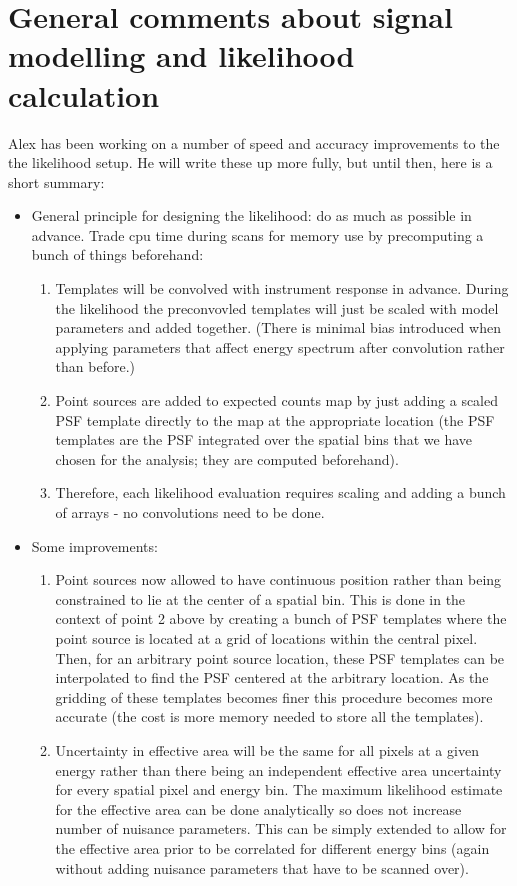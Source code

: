 \documentclass{article}
\begin{document}
\section{General comments about signal modelling and likelihood calculation}

Alex has been working on a number of speed and accuracy improvements to the the likelihood setup.  He will write these up more fully, but until then, here is a short summary:
\begin{itemize}
\item General principle for designing the likelihood: do as much as possible in advance. Trade cpu time during scans for memory use by precomputing a bunch of things beforehand:\begin{enumerate}
\item Templates will be convolved with instrument response in advance. During the likelihood the preconvovled templates will just be scaled with model parameters and added together. (There is minimal bias introduced when applying parameters that affect energy spectrum after convolution rather than before.)
\item Point sources are added to expected counts map by just adding a scaled PSF template directly to the map at the appropriate location (the PSF templates are the PSF integrated over the spatial bins that we have chosen for the analysis; they are computed beforehand).
\item Therefore, each likelihood evaluation requires scaling and adding a bunch of arrays - no convolutions need to be done.
\end{enumerate}
\item Some improvements:\begin{enumerate}
\item Point sources now allowed to have continuous position rather than being constrained to lie at the center of a spatial bin. This is done in the context of point 2 above by creating a bunch of PSF templates where the point source is located at a grid of locations within the central pixel. Then, for an arbitrary point source location, these PSF templates can be interpolated to find the PSF centered at the arbitrary location. As the gridding of these templates becomes finer this procedure becomes more accurate (the cost is more memory needed to store all the templates).
\item Uncertainty in effective area will be the same for all pixels at a given energy rather than there being an independent effective area uncertainty for every spatial pixel and energy bin. The maximum likelihood estimate for the effective area can be done analytically so does not increase number of nuisance parameters. This can be simply extended to allow for the effective area prior to be correlated for different energy bins (again without adding nuisance parameters that have to be scanned over).
\end{enumerate}
\end{itemize}
\end{document}
